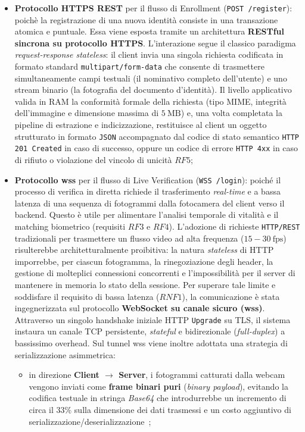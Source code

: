 \begin{itemize}
    \item \textbf{Protocollo HTTPS REST} per il flusso di Enrollment (\texttt{POST /register}): poichè la registrazione di una nuova identità consiste in una transazione atomica e puntuale. Essa viene esposta tramite un architettura \textbf{RESTful sincrona su protocollo HTTPS}. L'interazione segue il classico paradigma \textit{request-response stateless}: il client invia una singola richiesta codificata in formato standard \texttt{multipart/form-data} che consente di trasmettere simultaneamente campi testuali (il nominativo completo dell'utente) e uno stream binario (la fotografia del documento d'identità). Il livello applicativo valida in RAM la conformità formale della richiesta (tipo MIME, integrità dell'immagine e dimensione massima di $5~\text{MB}$) e, una volta completata la pipeline di estrazione e indicizzazione, restituisce al client un oggetto strutturato in formato \texttt{JSON} accompagnato dal codice di stato semantico \texttt{HTTP 201 Created} in caso di successo, oppure un codice di errore \texttt{HTTP 4xx} in caso di rifiuto o violazione del vincolo di unicità $RF5$;
    \item \textbf{Protocollo \gls{wss}} per il flusso di Live Verification (\texttt{WSS /login}): poiché il processo di verifica in diretta richiede il trasferimento \textit{real-time} e a bassa latenza di una sequenza di fotogrammi dalla fotocamera del client verso il backend. Questo è utile per alimentare l'analisi temporale di vitalità e il matching biometrico (requisiti $RF3$ e $RF4$). L'adozione di richieste \texttt{HTTP/REST} tradizionali per trasmettere un flusso video ad alta frequenza ($15-30~\text{fps}$) risulterebbe architetturalmente proibitiva: la natura \textit{stateless} di HTTP imporrebbe, per ciascun fotogramma, la rinegoziazione degli header, la gestione di molteplici connessioni concorrenti e l'impossibilità per il server di mantenere in memoria lo stato della sessione. Per superare tale limite e soddisfare il requisito di bassa latenza ($RNF1$), la comunicazione è stata ingegnerizzata sul protocollo \textbf{WebSocket su canale sicuro (\gls{wss})}. Attraverso un singolo handshake iniziale HTTP \texttt{Upgrade} su TLS, il sistema instaura un canale TCP persistente, \textit{stateful} e bidirezionale (\textit{full-duplex}) a bassissimo overhead. Sul tunnel \gls{wss} viene inoltre adottata una strategia di serializzazione asimmetrica:
    \begin{itemize}
        \item in direzione \textbf{Client $\rightarrow$ Server}, i fotogrammi catturati dalla webcam vengono inviati come \textbf{frame binari puri} (\textit{binary payload}), evitando la codifica testuale in stringa \textit{Base64} che introdurrebbe un incremento di circa il $33\%$ sulla dimensione dei dati trasmessi e un costo aggiuntivo di serializzazione/deserializzazione~\cite{sawetsutipunFacialImageVerification2020a};

\end{itemize}
\end{itemize}
